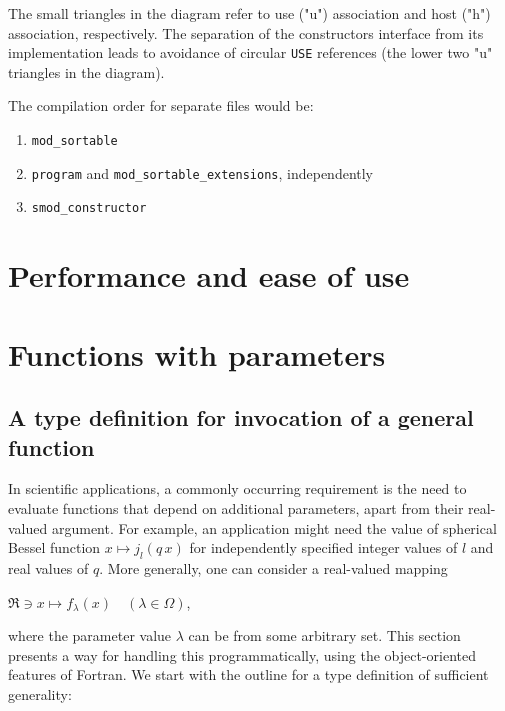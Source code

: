 \documentclass[
]{scrartcl}
\providecommand{\tightlist}{%
  \setlength{\itemsep}{0pt}\setlength{\parskip}{0pt}}
\begin{document}
The small triangles in the diagram refer to use ("u") association and
host ("h") association, respectively. The separation of the
constructor\textquotesingle s interface from its implementation leads to
avoidance of circular \texttt{USE} references (the lower two "u"
triangles in the diagram).

The compilation order for separate files would be:

\begin{enumerate}
\def\labelenumi{\arabic{enumi}.}
\tightlist
\item
  \texttt{mod\_sortable}
\item
  \texttt{program} and \texttt{mod\_sortable\_extensions}, independently
\item
  \texttt{smod\_constructor}
\end{enumerate}

\section{Performance and ease of use}\label{performance-and-ease-of-use}

\section{Functions with parameters}\label{functions-with-parameters}

\subsection{A type definition for invocation of a general
function}\label{a-type-definition-for-invocation-of-a-general-function}

In scientific applications, a commonly occurring requirement is the need
to evaluate functions that depend on additional parameters, apart from
their real-valued argument. For example, an application might need the
value of spherical Bessel function \(x \mapsto j_l(q \, x)\) for
independently specified integer values of \(l\) and real values of
\(q\). More generally, one can consider a real-valued mapping

\(\Re \ni x \mapsto f_\lambda(x) \quad (\lambda \in \Omega)\),

where the parameter value \(\lambda\) can be from some arbitrary set.
This section presents a way for handling this programmatically, using
the object-oriented features of Fortran. We start with the outline for a
type definition of sufficient generality:
\end{document}
